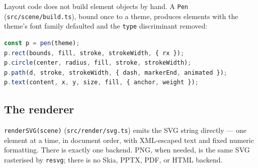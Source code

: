 Layout code does not build element objects by hand. A \texttt{Pen}
(\texttt{src/scene/build.ts}), bound once to a theme, produces elements with the
theme's font family defaulted and the \texttt{type} discriminant removed:

\begin{lstlisting}[language=ts]
const p = pen(theme);
p.rect(bounds, fill, stroke, strokeWidth, { rx });
p.circle(center, radius, fill, stroke, strokeWidth);
p.path(d, stroke, strokeWidth, { dash, markerEnd, animated });
p.text(content, x, y, size, fill, { anchor, weight });
\end{lstlisting}

\subsection{The renderer}

\texttt{renderSVG(scene)} (\texttt{src/render/svg.ts}) emits the SVG string
directly --- one element at a time, in document order, with XML-escaped text and
fixed numeric formatting. There is exactly one backend. PNG, when needed, is the
same SVG rasterised by \texttt{resvg}; there is no Skia, PPTX, PDF, or HTML
backend.

